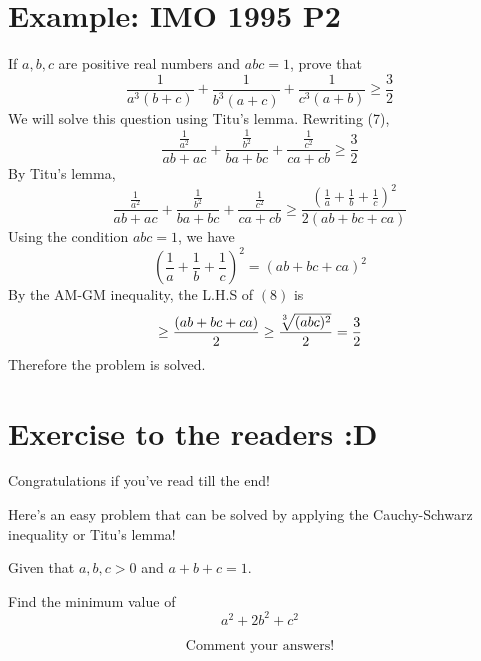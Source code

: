 \documentclass[12pt]{article}
\begin{document}
\newpage
\section{Example: IMO 1995 P2}
If $a,b,c$ are positive real numbers and $abc=1$, prove that
\begin{equation} 
\frac{1}{a^{3}(b+c)}+\frac{1}{b^{3}(a+c)}+\frac{1}{c^{3}(a+b)} \geq \frac{3}{2}
\end{equation}
We will solve this question using Titu's lemma. Rewriting (7), 
$$\frac{\frac{1}{a^{2}}}{a b+a c}+\frac{\frac{1}{b^{2}}}{b a+b c}+\frac{\frac{1}{c^{2}}}{c a+c b} \geq \frac32$$
By Titu's lemma,
\begin{equation} 
\frac{\frac{1}{a^{2}}}{a b+a c}+\frac{\frac{1}{b^{2}}}{b a+b c}+\frac{\frac{1}{c^{2}}}{c a+c b} \geq
\frac{\left(\frac{1}{a}+\frac{1}{b}+\frac{1}{c}\right)^{2}}{2(a b+b c+c a)}
\end{equation}
Using the condition $abc=1$, we have
$$\left(\frac{1}{a}+\frac{1}{b}+\frac{1}{c}\right)^{2}=(a b+b c+c a)^{2}$$
By the AM-GM inequality, the L.H.S of $(8)$
is
$$\geq \frac{(a b+b c+c a)}{2} \geq  \frac{\sqrt[\leftroot{2}\uproot{2}3]{(a b c)^{2}}}{2}=\frac{3}{2}$$
Therefore the problem is solved.

\newpage
\Large
\section{Exercise to the readers :D}
Congratulations if you've read till the end!

\bigskip
\noindent
Here's an easy problem that can be solved by applying the Cauchy-Schwarz inequality or Titu's lemma!
 
\bigskip
\begin{tcolorbox}
Given that $a,b,c>0$ and $a+b+c=1$.

\medskip
\noindent
Find the minimum value of
$$a^2+2b^2+c^2$$
\end{tcolorbox}
\bigskip
\noindent
\LARGE
$$\text{Comment your answers!}$$
\end{document}
